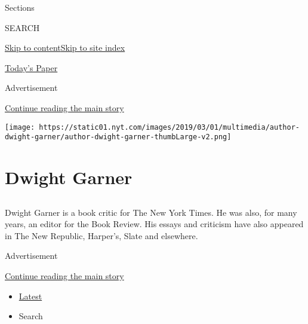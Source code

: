 Sections

SEARCH

\protect\hyperlink{site-content}{Skip to
content}\protect\hyperlink{site-index}{Skip to site index}

\href{https://myaccount.nytimes.com/auth/login?response_type=cookie\&client_id=vi}{}

\href{https://www.nytimes.com/section/todayspaper}{Today's Paper}

Advertisement

\protect\hyperlink{after-top}{Continue reading the main story}

\texttt{[image: https://static01.nyt.com/images/2019/03/01/multimedia/author-dwight-garner/author-dwight-garner-thumbLarge-v2.png]}

\hypertarget{dwight-garner}{%
\section{Dwight Garner}\label{dwight-garner}}

\subsection{}

Dwight Garner is a book critic for The New York Times. He was also, for
many years, an editor for the Book Review. His essays and criticism have
also appeared in The New Republic, Harper's, Slate and elsewhere.

Advertisement

\protect\hyperlink{after-mid1}{Continue reading the main story}

\begin{itemize}
\tightlist
\item
  \protect\hyperlink{stream-panel}{Latest}
\item
  Search
\end{itemize}

